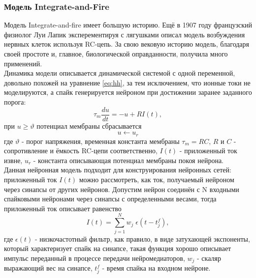 \documentclass[a4paper,10pt]{article}
\begin{document}
\subsubsection{Модель Integrate-and-Fire}

\indent Модель Integrate-and-fire имеет большую историю. Ещё в 1907 году 	французский физиолог Луи Лапик эксперементируя с лягушками описал модель возбуждения нервных клеток используя RC-цепь\cite{Lapicque}. За свою вековую историю модель, благодаря своей простоте и, главное, биологической оправданности, получила много применений.\\
   \indent Динамика модели описывается динамической системой с одной переменной, довольно похожей на уравнение \eqref{eq:hh}, за тем исключением, что ионные токи не моделируются, а спайк генерируется нейроном при достижении заранее заданного порога:\\
   \begin{equation}\label{eq:iaf}
   \tau_{m}\frac{du}{dt} =-u+R I(t),
   \end{equation}
при $u \geq \vartheta$ потенциал мембраны сбрасывается   
   \begin{equation}\label{eq:iaf_reset}
   u \leftarrow u_{r}
   \end{equation}
где $\vartheta$ - порог напряжения, временная константа мембраны $\tau_{m}=RC$, $R$ и $C$ - сопротивление и ёмкость RC-цепи соответственно, $I(t)$ - приложенный ток извне, $u_{r}$ - константа описывающая потенциал мембраны покоя нейрона.\\   
\indent Данная нейронная модель подходит для конструирования нейронных сетей: приложенный ток $I(t)$ можно рассмотреть, как ток, получаемый нейроном через синапсы от других нейронов. Допустим нейрон соединён с N входными спайковыми нейронами через синапсы с определенными весами, тогда приложенный ток описывает равенство
\begin{equation}\label{eq:iaf_syn}
I(t) = \sum_{j=1}^{N} w_{j}\; \epsilon(t-t_{j}^{f}),
\end{equation}
где $\epsilon(t)$ - низкочастотный фильтр, как правило, в виде затухающей экспоненты, который характеризует спайк на синапсе, такая функция хорошо описывает импульс переданный в процессе передачи нейромедиаторов, $w_{j}$ - скаляр выражающий вес на синапсе, $t_{j}^{f}$ - время спайка на входном нейроне.\\
\end{document}
